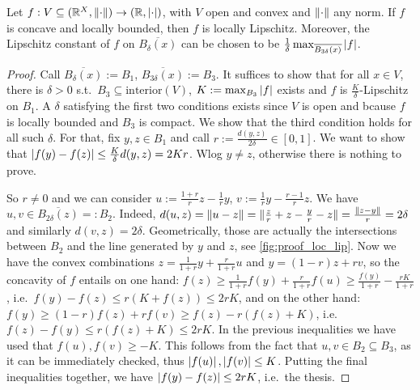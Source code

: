 \begin{theorem}\label{th:locLip}
Let $f:V\subseteq (\mathbb{R}^X,\lVert\cdot\rVert) \to (\mathbb{R},\left\lvert\cdot\right\rvert)$, with $V$ open and convex and $\lVert\cdot\rVert$ any norm.
If $f$ is concave and locally bounded, then $f$ is locally Lipschitz.
Moreover, the Lipschitz constant of $f$ on $\overline{B_{\delta}(x)}$ can be chosen to be $\frac{1}{\delta}\max_{\overline{B_{3\delta}(x)}} \left\lvert f\right\rvert$.
\end{theorem}
\begin{proof}
 Call $\overline{B_{\delta}(x)}:=B_1$, $\overline{B_{3\delta}(x)}:=B_3$.
 It suffices to show that for all $x\in V$, there is $\delta>0$ s.t.\ $B_3\subseteq \mathrm{interior}(V)$, $K:=\max_{B_3}  \left\lvert f\right\rvert$ exists and $f$ is $\frac{K}{\delta}$-Lipschitz on $B_1$.
A $\delta$ satisfying the first two conditions exists since $V$ is open and bcause $f$ is locally bounded and $B_3$ is compact.
We show that the third condition holds for all such $\delta$.
 For that, fix $y,z\in B_1$ and call $r:=\frac{d(y,z)}{2\delta}\in[0,1]$.
 We want to show that $\left\lvert f(y)-f(z)\right\rvert\leq \frac{K}{\delta}d(y,z)=2Kr$.
 Wlog $y\neq z$, otherwise there is nothing to prove.

 So $r\neq 0$ and we can consider $u:=\frac{1+r}{r}z-\frac{1}{r}y$, $v:=\frac{1}{r}y-\frac{r-1}{r}z$.
 We have $u,v\in \overline{B_{2\delta}(z)}=:B_2$.
 Indeed, $d(u,z)=\lVert u-z\rVert=\lVert\frac{z}{r}+z-\frac{y}{r}-z\rVert=\frac{\lVert z-y\rVert}{r}=2\delta$ and similarly $d(v,z)=2\delta$.
 Geometrically, those are actually the intersections between $B_2$ and the line generated by $y$ and $z$, see \autoref{fig:proof_loc_lip}.
 Now we have the convex combinations $z=\frac{1}{1+r}y+\frac{r}{1+r}u$ and $y=(1-r)z+rv$, so the concavity of $f$ entails on one hand:
 $f(z)\geq \frac{1}{1+r}f(y)+\frac{r}{1+r}f(u)\geq \frac{f(y)}{1+r} - \frac{rK}{1+r}$, i.e.\ $f(y)-f(z)\leq r(K+f(z))\leq 2rK$, and on the other hand:
 $f(y)\geq (1-r)f(z)+rf(v)\geq f(z)-r(f(z)+K)$, i.e.\ $f(z)-f(y)\leq r(f(z)+K)\leq 2rK$.
 In the previous inequalities we have used that $f(u),f(v)\geq -K$.
 This follows from the fact that $u,v\in B_2\subseteq B_3$, as it can be immediately checked, thus $\left\lvert f(u)\right\rvert,\left\lvert f(v)\right\rvert\leq K$.
 Putting the final inequalities together, we have $\left\lvert f(y)-f(z)\right\rvert\leq 2rK$, i.e.\ the thesis.
\end{proof}
